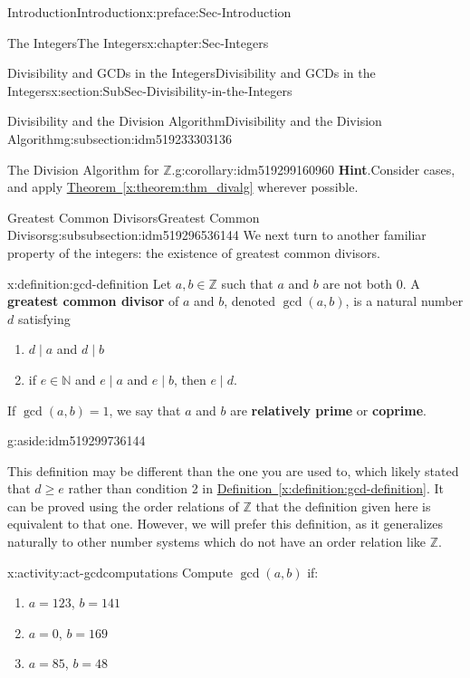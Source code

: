 \documentclass[oneside,10pt,]{book}
\newcommand{\blocktitlefont}{\relax}
\newcommand{\xreffont}{\relax}
\newcommand{\terminology}[1]{\textbf{#1}}
\numberwithin{equation}{section}
\renewcommand{\ge}{\geqslant}
\def\Z{{\mathbb Z}}
\def\N{{\mathbb N}}
\begin{document}
\begin{preface}{Introduction}{}{Introduction}{}{}{x:preface:Sec-Introduction}
\begin{chapterptx}{The Integers}{}{The Integers}{}{}{x:chapter:Sec-Integers}
\begin{sectionptx}{Divisibility and GCDs in the Integers}{}{Divisibility and GCDs in the Integers}{}{}{x:section:SubSec-Divisibility-in-the-Integers}
\begin{subsectionptx}{Divisibility and the Division Algorithm}{}{Divisibility and the Division Algorithm}{}{}{g:subsection:idm519233303136}
\begin{corollary}{The Division Algorithm for \(\Z\).}{}{g:corollary:idm519299160960}
\textbf{\blocktitlefont Hint}.\quad{}Consider cases, and apply \hyperref[x:theorem:thm_divalg]{Theorem~{\xreffont\ref{x:theorem:thm_divalg}}} wherever possible.%
\end{corollary}
\end{subsectionptx}
%
%
\typeout{************************************************}
\typeout{************************************************}
%
\begin{subsubsectionptx}{Greatest Common Divisors}{}{Greatest Common Divisors}{}{}{g:subsubsection:idm519296536144}
We next turn to another familiar property of the integers: the existence of greatest common divisors.%
\begin{definition}{}{x:definition:gcd-definition}%
\index{greatest common divisor (\(\Z\))}%
Let \(a,b\in \Z\) such that \(a\) and \(b\) are not both 0. A \terminology{greatest common divisor} of \(a\) and \(b\), denoted \(\gcd(a,b)\), is a natural number \(d\) satisfying%
\begin{enumerate}
\item{}\(d\mid a\) and \(d\mid b\)%
\item{}if \(e\in \N\) and \(e\mid a\) and \(e\mid b\), then \(e\mid d\).%
\end{enumerate}
%
\par
If \(\gcd(a,b) = 1\), we say that \(a\) and \(b\) are \terminology{relatively prime} or \terminology{coprime}. \begin{aside}{}{g:aside:idm519299736144}%
\end{aside}
%
\end{definition}
This definition may be different than the one you are used to, which likely stated that \(d \ge e\) rather than condition 2 in \hyperref[x:definition:gcd-definition]{Definition~{\xreffont\ref{x:definition:gcd-definition}}}. It can be proved using the order relations of \(\Z\) that the definition given here is equivalent to that one. However, we will prefer this definition, as it generalizes naturally to other number systems which do not have an order relation like \(\Z\).%
\begin{activity}{}{x:activity:act-gcdcomputations}%
Compute \(\gcd(a,b)\) if:%
\begin{enumerate}
\item{}\(a = 123\), \(b = 141\)%
\item{}\(a = 0\), \(b = 169\)%
\item{}\(a= 85\), \(b = 48\)%
\end{enumerate}

\end{activity}
\end{subsubsectionptx}
\end{sectionptx}
\end{chapterptx}
\end{preface}
\end{document}
